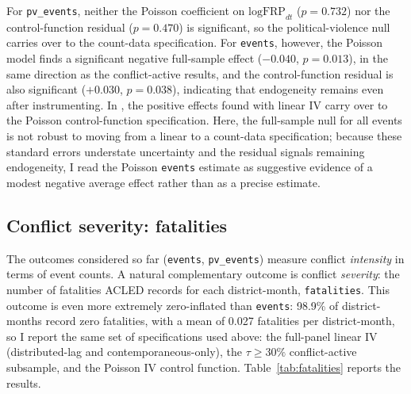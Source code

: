 \documentclass[12pt]{article}
\begin{document}
For \texttt{pv\_events}, neither the Poisson coefficient on $\text{logFRP}_{dt}$ ($p=0.732$) nor the control-function residual ($p=0.470$) is significant, so the political-violence null carries over to the count-data specification. For \texttt{events}, however, the Poisson model finds a significant negative full-sample effect ($-0.040$, $p=0.013$), in the same direction as the conflict-active results, and the control-function residual is also significant ($+0.030$, $p=0.038$), indicating that endogeneity remains even after instrumenting. In \citet{lu2023fish}, the positive effects found with linear IV carry over to the Poisson control-function specification. Here, the full-sample null for all events is not robust to moving from a linear to a count-data specification; because these standard errors understate uncertainty and the residual signals remaining endogeneity, I read the Poisson \texttt{events} estimate as suggestive evidence of a modest negative average effect rather than as a precise estimate.

\subsection{Conflict severity: fatalities}
\label{sec:fatalities}

The outcomes considered so far (\texttt{events}, \texttt{pv\_events}) measure conflict \emph{intensity} in terms of event counts. A natural complementary outcome is conflict \emph{severity}: the number of fatalities ACLED records for each district-month, \texttt{fatalities}. This outcome is even more extremely zero-inflated than \texttt{events}: 98.9\% of district-months record zero fatalities, with a mean of 0.027 fatalities per district-month, so I report the same set of specifications used above: the full-panel linear IV (distributed-lag and contemporaneous-only), the $\tau \geq 30\%$ conflict-active subsample, and the Poisson IV control function. Table~\ref{tab:fatalities} reports the results.
\end{document}
